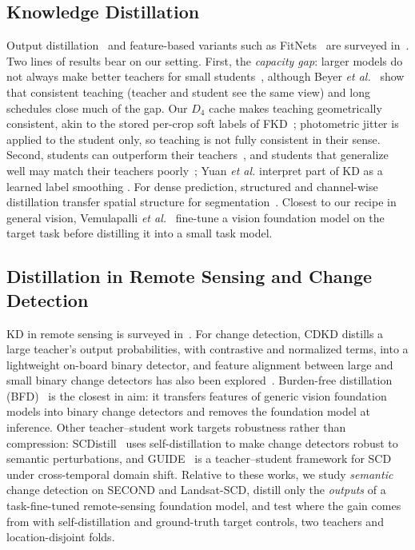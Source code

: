 \documentclass[journal]{IEEEtran}
\begin{document}
\subsection{Knowledge Distillation}
Output distillation~\cite{hinton2015distilling} and feature-based variants such as
FitNets~\cite{romero2014fitnets} are surveyed in~\cite{gou2021knowledge}. Two lines of results bear on our
setting. First, the \emph{capacity gap}: larger models do not always make better teachers for small students~\cite{cho2019efficacy,mirzadeh2020improved}, although
Beyer \emph{et al.}~\cite{beyer2022knowledge} show that consistent teaching (teacher and
student see the same view) and long schedules close much of the gap. Our $D_4$ cache makes teaching
geometrically consistent, akin to the stored per-crop soft labels of FKD~\cite{shen2022fast};
photometric jitter is applied to the student only, so teaching is not fully consistent in their
sense. Second, students can outperform their teachers~\cite{furlanello2018born,yuan2020revisiting}, and students that generalize well
may match their teachers poorly~\cite{stanton2021knowledge}; Yuan \emph{et al.}
\cite{yuan2020revisiting} interpret part of KD as a learned label smoothing
\cite{szegedy2016rethinking,muller2019label}. For dense prediction, structured and channel-wise distillation transfer spatial structure for segmentation~\cite{liu2019structured,shu2021channel}. Closest to our
recipe in general vision, Vemulapalli \emph{et al.}~\cite{vemulapalli2024knowledge} fine-tune
a vision foundation model on the target task before distilling it into a small task model.

\subsection{Distillation in Remote Sensing and Change Detection}
KD in remote sensing is surveyed in~\cite{himeur2025applications}. For change detection, CDKD
\cite{wang2024knowledge} distills a large teacher's output probabilities, with contrastive and
normalized terms, into a lightweight on-board binary detector, and feature alignment between large and small binary change detectors has also been explored~\cite{yang2026intrascale}. Burden-free distillation (BFD)~\cite{wang2025burden} is the closest in
aim: it transfers features of generic vision foundation models into binary change detectors
and removes the foundation model at inference. Other teacher--student work targets robustness rather than compression: SCDistill~\cite{qu2026semantic} uses self-distillation to make change detectors robust to semantic perturbations, and GUIDE~\cite{huang2026guide} is a teacher--student framework for SCD under cross-temporal domain shift. Relative to these works, we study \emph{semantic} change
detection on SECOND and Landsat-SCD, distill only the \emph{outputs} of a task-fine-tuned
remote-sensing foundation model, and test where the gain comes from with self-distillation and
ground-truth target controls, two teachers and location-disjoint folds.
\end{document}
